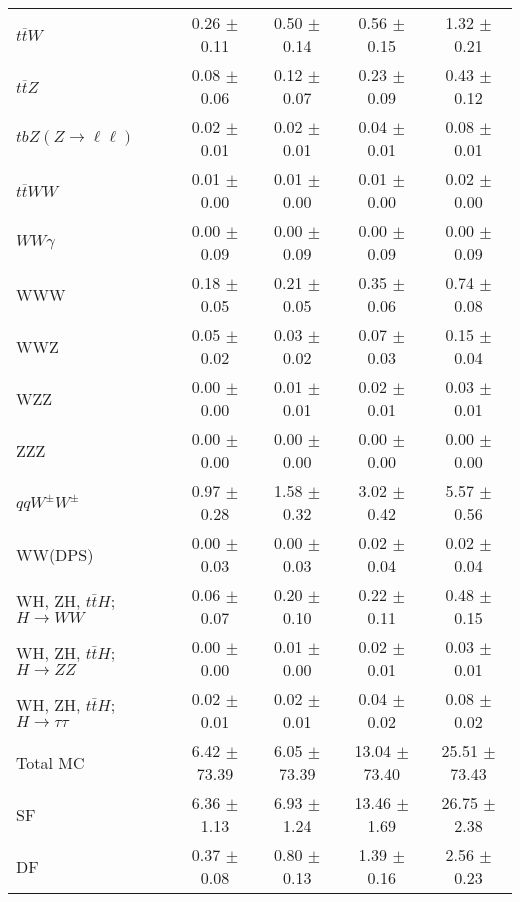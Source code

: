 \begin{tabular}{l|cccc}
                   $t\overline{t}W$ &  0.26 $\pm$  0.11 &  0.50 $\pm$  0.14 &  0.56 $\pm$  0.15 &  1.32 $\pm$  0.21 \\
                   $t\overline{t}Z$ &  0.08 $\pm$  0.06 &  0.12 $\pm$  0.07 &  0.23 $\pm$  0.09 &  0.43 $\pm$  0.12 \\
    $tbZ (Z \rightarrow \ell \ell)$ &  0.02 $\pm$  0.01 &  0.02 $\pm$  0.01 &  0.04 $\pm$  0.01 &  0.08 $\pm$  0.01 \\
                  $t\overline{t}WW$ &  0.01 $\pm$  0.00 &  0.01 $\pm$  0.00 &  0.01 $\pm$  0.00 &  0.02 $\pm$  0.00 \\
                         $WW\gamma$ &  0.00 $\pm$  0.09 &  0.00 $\pm$  0.09 &  0.00 $\pm$  0.09 &  0.00 $\pm$  0.09 \\
                                WWW &  0.18 $\pm$  0.05 &  0.21 $\pm$  0.05 &  0.35 $\pm$  0.06 &  0.74 $\pm$  0.08 \\
                                WWZ &  0.05 $\pm$  0.02 &  0.03 $\pm$  0.02 &  0.07 $\pm$  0.03 &  0.15 $\pm$  0.04 \\
                                WZZ &  0.00 $\pm$  0.00 &  0.01 $\pm$  0.01 &  0.02 $\pm$  0.01 &  0.03 $\pm$  0.01 \\
                                ZZZ &  0.00 $\pm$  0.00 &  0.00 $\pm$  0.00 &  0.00 $\pm$  0.00 &  0.00 $\pm$  0.00 \\
                 $qqW^{\pm}W^{\pm}$ &  0.97 $\pm$  0.28 &  1.58 $\pm$  0.32 &  3.02 $\pm$  0.42 &  5.57 $\pm$  0.56 \\
                            WW(DPS) &  0.00 $\pm$  0.03 &  0.00 $\pm$  0.03 &  0.02 $\pm$  0.04 &  0.02 $\pm$  0.04 \\
WH, ZH, $t\bar{t}H$; $H \rightarrow WW$ &  0.06 $\pm$  0.07 &  0.20 $\pm$  0.10 &  0.22 $\pm$  0.11 &  0.48 $\pm$  0.15 \\
WH, ZH, $t\bar{t}H$; $H \rightarrow ZZ$ &  0.00 $\pm$  0.00 &  0.01 $\pm$  0.00 &  0.02 $\pm$  0.01 &  0.03 $\pm$  0.01 \\
WH, ZH, $t\bar{t}H$; $H \rightarrow \tau\tau$ &  0.02 $\pm$  0.01 &  0.02 $\pm$  0.01 &  0.04 $\pm$  0.02 &  0.08 $\pm$  0.02 \\
\hline\hline
                           Total MC &  6.42 $\pm$ 73.39 &  6.05 $\pm$ 73.39 & 13.04 $\pm$ 73.40 & 25.51 $\pm$ 73.43 \\
\hline
                                 SF &  6.36 $\pm$  1.13 &  6.93 $\pm$  1.24 & 13.46 $\pm$  1.69 & 26.75 $\pm$  2.38 \\
                                 DF &  0.37 $\pm$  0.08 &  0.80 $\pm$  0.13 &  1.39 $\pm$  0.16 &  2.56 $\pm$  0.23 \\

\end{tabular}
